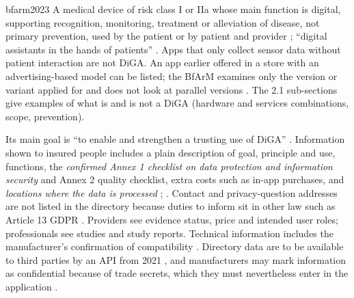 \begin{papercard}{bfarm2023}
 A medical device of risk class I or IIa whose main function is digital, supporting recognition, monitoring, treatment or alleviation of disease, not primary prevention, used by the patient or by patient and provider ; ``digital assistants in the hands of patients'' . Apps that only collect sensor data without patient interaction are not DiGA. An app earlier offered in a store with an advertising-based model can be listed; the BfArM examines only the version or variant applied for and does not look at parallel versions . The 2.1 sub-sections give examples of what is and is not a DiGA (hardware and services combinations, scope, prevention).

 Its main goal is ``to enable and strengthen a trusting use of DiGA'' . Information shown to insured people includes a plain description of goal, principle and use, functions, the \emph{confirmed Annex 1 checklist on data protection and information security} and Annex 2 quality checklist, extra costs such as in-app purchases, and \emph{locations where the data is processed} ; . Contact and privacy-question addresses are not listed in the directory because duties to inform sit in other law such as Article 13 GDPR . Providers see evidence status, price and intended user roles; professionals see studies and study reports. Technical information includes the manufacturer's confirmation of compatibility . Directory data are to be available to third parties by an API from 2021 , and manufacturers may mark information as confidential because of trade secrets, which they must nevertheless enter in the application .


\end{papercard}
